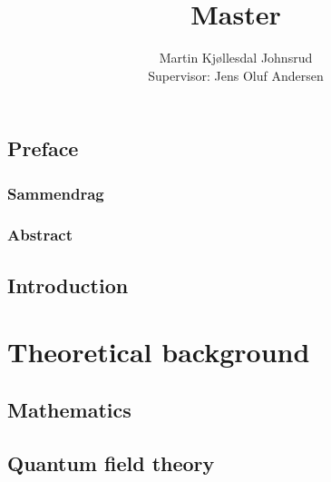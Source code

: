 \documentclass[10pt, a4paper]{book}
\title{\huge{Master}}
\author{
    \large{Martin Kjøllesdal Johnsrud}\\
    \normalsize{Supervisor: Jens Oluf Andersen}
    }
\begin{document}
    \maketitle
    \frontmatter
    
    \chapter*{Preface}
    \setcounter{page}{1}
    
    \clearpage

    \section*{Sammendrag}
    
    \clearpage
    
    \section*{Abstract}
    


    \listoftodos
    \clearpage
    \setcounter{tocdepth}{1}
    \tableofcontents
   
    \setlength{\parindent}{0em}
    \setlength{\parskip}{0.8em}

    \mainmatter

    \chapter{Introduction}
    \label{chapter: introduction}
    

    \part{Theoretical background}
    \label{part: theoretical background}

    \chapter{Mathematics}
    \label{chapter: math}
    
    

    \chapter{Quantum field theory}
    \label{chapter: QFT}
    
    
    
    
    
\end{document}
